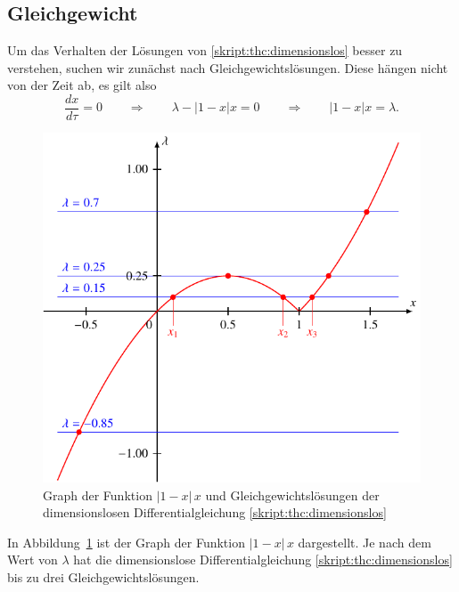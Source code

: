 \subsection{Gleichgewicht}
Um das Verhalten der Lösungen von 
\eqref{skript:thc:dimensionslos}
besser zu verstehen, suchen wir zunächst nach Gleichgewichtslösungen.
Diese hängen nicht von der Zeit ab, es gilt also
\begin{equation}
\frac{dx}{d\tau}=0
\qquad\Rightarrow\qquad
\lambda-|1-x|x=0
\qquad\Rightarrow\qquad
|1-x|x
=
\lambda.
\label{skript:thc:lambdagl}
\end{equation}
\begin{figure}
\centering
\includegraphics{chapters/4/rhs.pdf}
\caption{Graph der Funktion $|1-x|\,x$ und
Gleichgewichtslösungen der dimensionslosen Differentialgleichung
\eqref{skript:thc:dimensionslos}
\label{skript:thc:1-xxgraph}}
\end{figure}
In Abbildung~\ref{skript:thc:1-xxgraph} ist der Graph der Funktion 
$|1-x|\,x$ dargestellt.
Je nach dem Wert von $\lambda$ hat die dimensionslose Differentialgleichung
\eqref{skript:thc:dimensionslos} bis zu drei Gleichgewichtslösungen.

